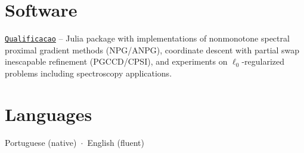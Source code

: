 \documentclass[11pt,a4paper]{article}
\begin{document}
\section{Software}

\begin{enumerate}[leftmargin=1.5em, label={[\arabic*]}]
    \item \href{https://github.com/GBelemBarbosa/Qualificacao}{\texttt{Qualificacao}} -- Julia package with implementations of nonmonotone spectral proximal gradient methods (NPG/ANPG), coordinate descent with partial swap inescapable refinement (PGCCD/CPSI), and experiments on $\ell_0$-regularized problems including spectroscopy applications.
\end{enumerate}

\section{Languages}

Portuguese (native) \,$\cdot$\, English (fluent)
\end{document}

